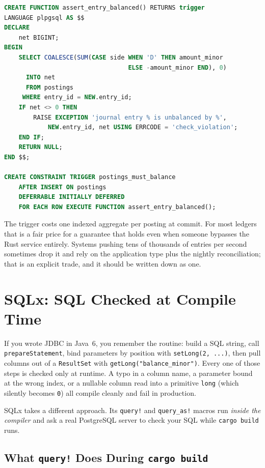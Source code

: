 \begin{lstlisting}[language=SQL, caption={A deferred constraint trigger that rejects unbalanced journal entries at commit time.}]
CREATE FUNCTION assert_entry_balanced() RETURNS trigger
LANGUAGE plpgsql AS $$
DECLARE
    net BIGINT;
BEGIN
    SELECT COALESCE(SUM(CASE side WHEN 'D' THEN amount_minor
                                  ELSE -amount_minor END), 0)
      INTO net
      FROM postings
     WHERE entry_id = NEW.entry_id;
    IF net <> 0 THEN
        RAISE EXCEPTION 'journal entry % is unbalanced by %',
            NEW.entry_id, net USING ERRCODE = 'check_violation';
    END IF;
    RETURN NULL;
END $$;

CREATE CONSTRAINT TRIGGER postings_must_balance
    AFTER INSERT ON postings
    DEFERRABLE INITIALLY DEFERRED
    FOR EACH ROW EXECUTE FUNCTION assert_entry_balanced();
\end{lstlisting}

The trigger costs one indexed aggregate per posting at commit. For most ledgers that is a fair price for a guarantee that holds even when someone bypasses the Rust service entirely. Systems pushing tens of thousands of entries per second sometimes drop it and rely on the application type plus the nightly reconciliation; that is an explicit trade, and it should be written down as one.

\section{SQLx: SQL Checked at Compile Time}
\label{ch14:sqlx}

If you wrote JDBC in Java~6, you remember the routine: build a SQL string, call \texttt{prepareStatement}, bind parameters by position with \texttt{setLong(2, ...)}, then pull columns out of a \texttt{ResultSet} with \texttt{getLong("balance\_minor")}. Every one of those steps is checked only at runtime. A typo in a column name, a parameter bound at the wrong index, or a nullable column read into a primitive \texttt{long} (which silently becomes \texttt{0}) all compile cleanly and fail in production.

SQLx takes a different approach. Its \texttt{query!} and \texttt{query\_as!} macros run \emph{inside the compiler} and ask a real PostgreSQL server to check your SQL while \texttt{cargo build} runs.

\subsection{What \texttt{query!} Does During \texttt{cargo build}}

